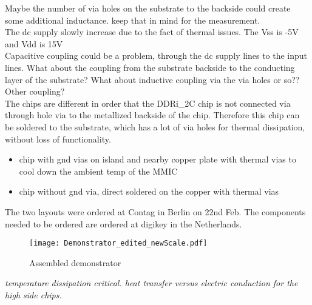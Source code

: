 Maybe the number of via holes on the substrate to the backside could create some additional inductance. keep that in mind for the measurement.\\
The dc supply slowly increase due to the fact of thermal issues. 
The Vss is -5V and Vdd is 15V\\
Capacitive coupling could be a problem, through the dc supply lines to the input lines.
What about the coupling from the substrate backside to the conducting layer of the substrate? 
What about inductive coupling via the via holes or so??
Other coupling?\\
The chips are different in order that the DDRi\_2C chip is not connected via through hole via to the metallized backside of the chip. 
Therefore this chip can be soldered to the substrate, which has a lot of via holes for thermal dissipation, without loss of functionality.

	\begin{itemize}
		\item chip with gnd vias on island and nearby copper plate with thermal vias to cool down the ambient temp of the MMIC
		\item chip without gnd via, direct soldered on the copper with thermal vias
	\end{itemize}

The two layouts were ordered at Contag in Berlin on 22nd Feb.
The components needed to be ordered are ordered at digikey in the Netherlands.

\begin{figure}[htb!]
	\centering
  \texttt{[image: Demonstrator\_edited\_newScale.pdf]}
	\caption{Assembled demonstrator}
	\label{fig:assembledDemonstrator}
\end{figure}

\textit{temperature dissipation critical. heat transfer versus electric conduction for the high side chips.}
